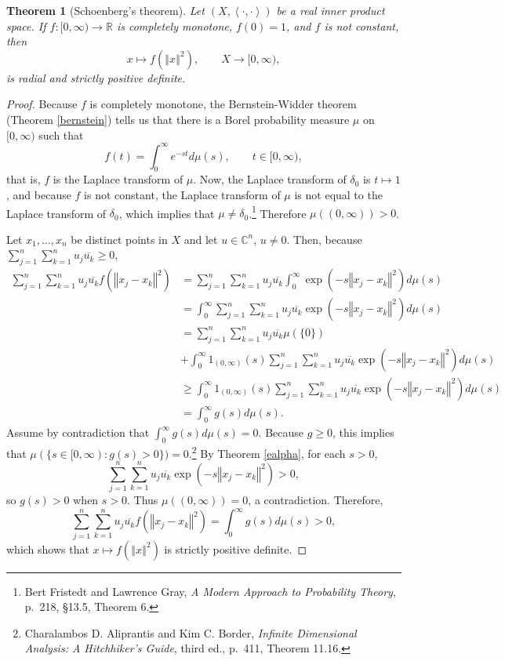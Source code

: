 \documentclass{article}
\newcommand{\inner}[2]{\left\langle #1, #2 \right\rangle}
\newcommand{\norm}[1]{\left\Vert #1 \right\Vert}
\newtheorem{theorem}{Theorem}
\theoremstyle{definition}
\begin{document}
\begin{theorem}[Schoenberg's theorem]
Let $(X,\inner{\cdot}{\cdot})$ be a real  inner product space.
If $f:[0,\infty) \to \mathbb{R}$ is completely monotone, $f(0)=1$,  and $f$ is not constant, then
\[
x \mapsto f(\norm{x}^2), \qquad X \to [0,\infty),
\]
is radial and strictly positive definite.
\end{theorem}
\begin{proof}
Because $f$ is completely monotone, the Bernstein-Widder theorem (Theorem \ref{bernstein}) tells us that
there is a Borel probability measure $\mu$ on $[0,\infty)$ such that
\[
f(t) = \int_0^\infty e^{-st} d\mu(s),\qquad t \in [0,\infty),
\]
that is, $f$ is the Laplace transform of $\mu$. Now, the Laplace transform of $\delta_0$ is $t \mapsto 1$,
and because $f$ is not constant, the Laplace transform of $\mu$ is not equal to the Laplace transform of $\delta_0$,
which implies that $\mu \neq \delta_0$.\footnote{Bert Fristedt and Lawrence Gray, {\em A Modern Approach
to Probability Theory},
p.~218, \S 13.5, Theorem 6.} Therefore $\mu((0,\infty))>0$. 


Let $x_1,\ldots,x_n$ be distinct points in $X$ and let $u \in \mathbb{C}^n$, $u \neq 0$. Then, because
$\sum_{j=1}^n \sum_{k=1}^n u_j \overline{u_k} \geq 0$,
\begin{align*}
\sum_{j=1}^n \sum_{k=1}^n u_j \overline{u_k} f(\norm{x_j-x_k}^2)&=
\sum_{j=1}^n \sum_{k=1}^n u_j \overline{u_k} \int_0^\infty \exp\left(-s \norm{x_j-x_k}^2 \right) d\mu(s)\\
&=\int_0^\infty \sum_{j=1}^n \sum_{k=1}^n u_j \overline{u_k} \exp\left(-s \norm{x_j -  x_k}^2\right) d\mu(s)\\
&=\sum_{j=1}^n \sum_{k=1}^n u_j \overline{u_k} \mu(\{0\})\\
&+\int_0^\infty 1_{(0,\infty)}(s)  \sum_{j=1}^n \sum_{k=1}^n u_j \overline{u_k} \exp\left(-s \norm{x_j -  x_k}^2\right) d\mu(s)\\
&\geq\int_0^\infty 1_{(0,\infty)}(s)  \sum_{j=1}^n \sum_{k=1}^n u_j \overline{u_k} \exp\left(-s \norm{x_j -  x_k}^2\right) d\mu(s)\\
&=\int_0^\infty g(s) d\mu(s).
\end{align*}
Assume by contradiction that $\int_0^\infty g(s) d\mu(s)=0$. Because
$g \geq 0$, this implies that
$\mu(\{s \in [0,\infty): g(s)>0\})=0$.\footnote{Charalambos D. Aliprantis
and Kim C. Border, {\em Infinite Dimensional Analysis: A Hitchhiker's Guide}, third ed., p.~411, Theorem 11.16.}
By Theorem \ref{ealpha}, for each $s>0$,
\[
\sum_{j=1}^n \sum_{k=1}^n u_j \overline{u_k} \exp\left(-s \norm{x_j -  x_k}^2\right) >0,
\]
so $g(s)>0$ when  $s>0$. Thus $\mu((0,\infty))=0$, a contradiction. Therefore,
\[
\sum_{j=1}^n \sum_{k=1}^n u_j \overline{u_k} f(\norm{x_j-x_k}^2) = \int_0^\infty g(s) d\mu(s)>0,
\]
which shows that $x \mapsto f(\norm{x}^2)$ is strictly positive definite. 
\end{proof}
\end{document}
